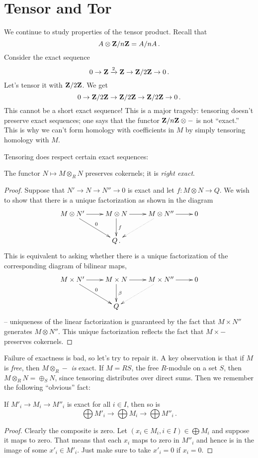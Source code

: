 \section{Tensor and Tor}

We continue to study properties of the tensor product. Recall that 
\[
A\otimes \mathbf Z/n\mathbf Z=A/nA\,.
\]
Consider the exact sequence 
\[
0\to \mathbf Z\xrightarrow{2}\mathbf Z\to \mathbf Z/2\mathbf Z\to 0\,.
\]
Let's tensor it with $\mathbf Z/2\mathbf Z$. We get
\[
0\to \mathbf Z/2\mathbf Z\to\mathbf Z/2\mathbf Z\to\mathbf Z/2\mathbf Z\to 0\,.
\]
This cannot be a short exact sequence! 
This is a major tragedy: tensoring doesn't preserve exact sequences; one says that the functor $\mathbf Z/n\mathbf Z\otimes-$ is not ``exact.'' This is why we can't form homology with coefficients in $M$ by simply tensoring homology with $M$. 

Tensoring does respect certain exact sequences:
\begin{prop}
The functor $N\mapsto M\otimes_R N$ preserves cokernels; it is \emph{right exact}. 
\end{prop}
\begin{proof}
Suppose that $N'\to N\to N''\to0$ is exact and let $f:M\otimes N\to Q$.  
We wish to show that there is a unique factorization as shown in the diagram
\[
\xymatrix{ 
M\otimes N' \ar[r] \ar[dr]^0 & M\otimes N \ar[d]^f \ar[r] &
M\otimes N'' \ar[r] \ar@{.>}[dl] & 0 \\
& Q\,.
}\]
This is equivalent to asking whether there is a unique factorization
of the corresponding diagram of bilinear maps,
\[
\xymatrix{
M\times N' \ar[r] \ar[dr]^0 & M\times N \ar[d]^\beta \ar[r] &
M\times N'' \ar[r] \ar@{.>}[dl] & 0 \\
& Q 
}\]
-- uniqueness of the linear factorization is guaranteed by the fact that
$M\times N''$ generates $M\otimes N''$. This unique factorization reflects
the fact that $M\times-$ preserves cokernels. 
\end{proof}

Failure of exactness is bad, so let's try to repair it. A key observation 
is that if $M$ is {\em free}, then $M\otimes_R-$ {\em is} exact. 
If $M=RS$, the
free $R$-module on a set $S$, then $M\otimes_RN=\oplus_SN$, since tensoring
distributes over direct sums. Then we remember the following ``obvious'' fact:
\begin{lemma}
If $M'_i\to M_i\to M''_i$ is exact for all $i\in I$, then so is 
\[
\bigoplus M'_i\to\bigoplus M_i\to\bigoplus M''_i\,.
\]
\end{lemma}
\begin{proof} Clearly the composite is zero. Let 
$(x_i\in M_i,i\in I)\in\bigoplus M_i$ and suppose it maps to zero. 
That means that each $x_i$ maps to zero in $M''_i$ and hence is in the
image of some $x'_i\in M'_i$. Just make sure to take $x'_i=0$ if $x_i=0$. 
\end{proof}

